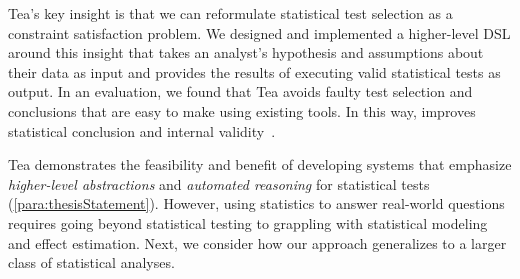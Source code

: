 Tea's key insight is that we can reformulate statistical test
selection as a constraint satisfaction problem. We designed and implemented a
higher-level DSL around this insight that takes an analyst's hypothesis and
assumptions about their data as input and provides the results of executing
valid statistical tests as output. In an evaluation, we found that Tea avoids
faulty test selection and conclusions that are easy to make using existing
tools. In this way, \tea improves statistical conclusion and internal validity~\cite{shadish2010campbell}. 

Tea demonstrates the feasibility and benefit of developing systems that
emphasize \textit{higher-level abstractions} and \textit{automated reasoning}
for statistical tests (\autoref{para:thesisStatement}). However, using
statistics to answer real-world questions requires going beyond statistical
testing to grappling with statistical modeling and effect estimation. Next, we
consider how our approach generalizes to a larger class of statistical analyses. 

